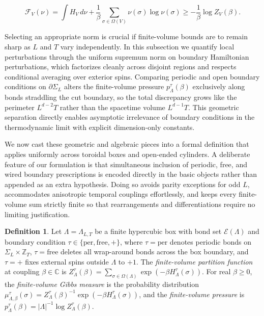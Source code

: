 \documentclass[11pt]{article}
\theoremstyle{definition}
\newtheorem{definition}[theorem]{Definition}
\begin{document}
\[
  \mathcal{F}_V(\nu) = \int H_V \, d\nu + \frac{1}{\beta} \sum_{\sigma \in \Omega(V)} \nu(\sigma) \log \nu(\sigma) \ge -\frac{1}{\beta} \log Z_V(\beta).
\]

Selecting an appropriate norm is crucial if finite-volume bounds are to remain sharp
as $L$ and $T$ vary independently. In this subsection we quantify local
perturbations through the uniform supremum norm on boundary Hamiltonian
perturbations, which factorizes cleanly across disjoint regions and respects
conditional averaging over exterior spins. Comparing periodic and open boundary
conditions on $\partial \Sigma_L$ alters the finite-volume pressure
$p_\Lambda^\tau(\beta)$ exclusively along bonds straddling the cut boundary, so the
total discrepancy grows like the perimeter $L^{d-2} T$ rather than the spacetime
volume $L^{d-1} T$. This geometric separation directly enables asymptotic
irrelevance of boundary conditions in the thermodynamic limit with explicit
dimension-only constants.

We now cast these geometric and algebraic pieces into a formal definition that
applies uniformly across toroidal boxes and open-ended cylinders. A deliberate
feature of our formulation is that simultaneous inclusion of periodic, free, and
wired boundary prescriptions is encoded directly in the basic objects rather than
appended as an extra hypothesis. Doing so avoids parity exceptions for odd $L$,
accommodates anisotropic temporal couplings effortlessly, and keeps every
finite-volume sum strictly finite so that rearrangements and differentiations
require no limiting justification.

\begin{definition}
\label{def:s02-gibbs}
Let $\Lambda = \Lambda_{L,T}$ be a finite hypercubic box with bond set
$\mathcal{E}(\Lambda)$ and boundary condition $\tau \in \{\mathrm{per},
\mathrm{free}, +\}$, where $\tau = \mathrm{per}$ denotes periodic bonds on $\Sigma_L
\times \mathbb{Z}_T$, $\tau = \mathrm{free}$ deletes all wrap-around bonds across
the box boundary, and $\tau = +$ fixes external spins outside $\Lambda$ to $+1$. The
\emph{finite-volume partition function} at coupling $\beta \in \mathbb{C}$ is
$Z_\Lambda^\tau(\beta) = \sum_{\sigma \in \Omega(\Lambda)} \exp(-\beta
H_\Lambda^\tau(\sigma))$. For real $\beta \ge 0$, the \emph{finite-volume Gibbs
measure} is the probability distribution $\mu_{\Lambda,\beta}^\tau(\sigma) =
Z_\Lambda^\tau(\beta)^{-1} \exp(-\beta H_\Lambda^\tau(\sigma))$, and the
\emph{finite-volume pressure} is $p_\Lambda^\tau(\beta) = |\Lambda|^{-1} \log
Z_\Lambda^\tau(\beta)$.
\end{definition}
\end{document}
